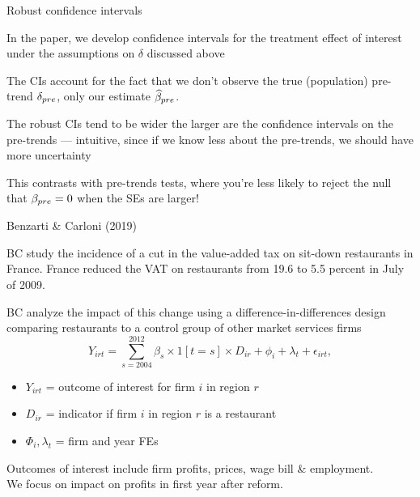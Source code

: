 \documentclass[aspectratio = 169, 13pt]{beamer}
\begin{document}
\begin{frame}{Robust confidence intervals}
	\begin{wideitemize}
		\item
		In the paper, we develop confidence intervals for the treatment effect of interest under the assumptions on $\delta$ discussed above
		
		\item
		The CIs account for the fact that we don't observe the true (population) pre-trend $\delta_{pre}$, only our estimate $\widehat{\beta}_{pre}$. 
		
		\item
		The robust CIs tend to be wider the larger are the confidence intervals on the pre-trends --- intuitive, since if we know less about the pre-trends, we should have more uncertainty
		
		\item
		This contrasts with pre-trends tests, where you're less likely to reject the null that $\beta_{pre} =0$ when the SEs are larger!
	\end{wideitemize}
\end{frame}



\begin{frame}{Benzarti \& Carloni (2019)}
	\begin{wideitemize}
		\item
		BC study the incidence of a cut in the value-added tax on sit-down restaurants in France.
		France reduced the VAT on restaurants from 19.6 to 5.5 percent in July of 2009. 
		
		\item
		BC analyze the impact of this change using a difference-in-differences design comparing restaurants to a control group of other market services firms
		\vspace{-3mm}
		\begin{equation}
			Y_{irt} = \sum_{s = 2004}^{2012} \beta_s \times 1[t = s] \times  D_{ir} + \phi_i + \lambda_t + \epsilon_{irt} , \label{eqn: bc event-study spec}    
		\end{equation}
		\vspace{-3mm}
		\noindent 
    \begin{itemize}
      \item $Y_{irt}$ = outcome of interest for firm $i$ in region $r$
      \item $D_{ir}$ = indicator if firm $i$ in region $r$ is a restaurant
      \item $\Phi_i, \lambda_t$ = firm and year FEs
		\end{itemize}
		
		\item Outcomes of interest include firm profits, prices, wage bill \& employment.\\
		We focus on impact on profits in first year after reform.
	\end{wideitemize}
\end{frame}
\end{document}
